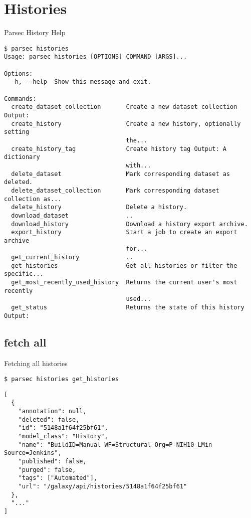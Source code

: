\documentclass[12pt]{phage3slides} %
\begin{document}
\section{Histories}
\begin{frame}[fragile]{Parsec History Help}
\begin{verbatim}
$ parsec histories
Usage: parsec histories [OPTIONS] COMMAND [ARGS]...

Options:
  -h, --help  Show this message and exit.

Commands:
  create_dataset_collection       Create a new dataset collection Output:
  create_history                  Create a new history, optionally setting
                                  the...
  create_history_tag              Create history tag Output: A dictionary
                                  with...
  delete_dataset                  Mark corresponding dataset as deleted.
  delete_dataset_collection       Mark corresponding dataset collection as...
  delete_history                  Delete a history.
  download_dataset                ..
  download_history                Download a history export archive.
  export_history                  Start a job to create an export archive
                                  for...
  get_current_history             ..
  get_histories                   Get all histories or filter the specific...
  get_most_recently_used_history  Returns the current user's most recently
                                  used...
  get_status                      Returns the state of this history Output:
\end{verbatim}
\end{frame}

\subsection{fetch all}
\begin{frame}[fragile,t]{Fetching all histories}
\begin{verbatim}
$ parsec histories get_histories
\end{verbatim}
\begin{verbatim}
[
  {
    "annotation": null,
    "deleted": false,
    "id": "5148a1f64f25bf61",
    "model_class": "History",
    "name": "BuildID=Manual WF=Structural Org=P-NIH10_LMin Source=Jenkins",
    "published": false,
    "purged": false,
    "tags": ["Automated"],
    "url": "/galaxy/api/histories/5148a1f64f25bf61"
  },
  "..."
]
\end{verbatim}
\end{frame}
\end{document}
